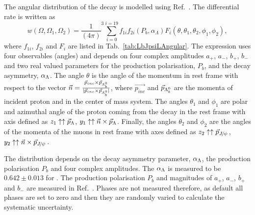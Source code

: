 %
The angular distribution of the \Lb\ra\jpsi\Lz decay is modelled using Ref.~\cite{Hrivnac:1994jx}.
The differential rate is written as
%
    \begin{equation}\label{eq:jpsiLambdaRate}
       w(\Omega ,\Omega_{1}, \Omega_{2}) =  {\frac{1}{(4\pi)}^{3}}
       \sum_{i=0}^{i=19} f_{1i} f_{2i}(P_{b} ,\alpha_{\Lambda}) F_{i}(\theta,
       \theta_{1},\theta_{2},\phi_{1},\phi_{2}),
      \end{equation}
where $f_{1i}$, $f_{2i}$ and $F_i$ are listed in Tab.~\ref{tab:LbJpsiLAngular}. The expression uses
four observables (angles) and depends on four complex amplitudes $a_+$, $a_-$, $b_+$, $b_-$ and two
real valued parameters for the production polarisation, $P_b$, and the \Lz decay asymmetry, $\alpha_\Lambda$.
The angle $\theta$ is the angle of the \Lz momentum in \Lb rest frame with respect to
the vector $\vec{n}=\frac{\vec{p}_{inc} \times \vec{p}_{\Lambda^0_b}} { |\vec{p}_{inc} \times \vec{p}_{\Lambda^0_b}|}$, where
$\vec{p_{inc}}$ and $\vec{p}_{\Lambda^0_b}$ are the momenta of incident proton and \Lb in the center of mass system.
The angles $\theta_1$ and $\phi_1$ are polar and azimuthal angle of the proton coming from the \Lz decay
in the \Lz rest frame with axis defined as
    $z_{1}\uparrow\uparrow\vec{p}_{\Lambda}$,
    $y_{1}\uparrow\uparrow\vec{n}\times\vec{p}_{\Lambda}$.
Finally, the angles $\theta_2$ and $\phi_2$ are the angles of the momenta of the muons in \jpsi rest frame
with axes defined as 
    $z_{2}\uparrow\uparrow\vec{p}_{\jpsi}$,
    $y_{2}\uparrow\uparrow\vec{n}\times\vec{p}_{\jpsi}$.

The distribution depends on the \Lz decay asymmetry parameter, $\alpha_\Lambda$, the production polarisation
$P_b$ and four complex amplitudes. The $\alpha_\Lambda$ is measured to be $0.642 \pm 0.013$ for \Lz.
The production polarisation $P_b$ and magnitudes of $a_+$, $a_-$, $b_+$ and $b_-$ are measured in
Ref.~\cite{LHCb-PAPER-2012-057}. Phases are not measured therefore, as default all phases are set to
zero and then they are randomly varied to calculate the systematic uncertainty.



